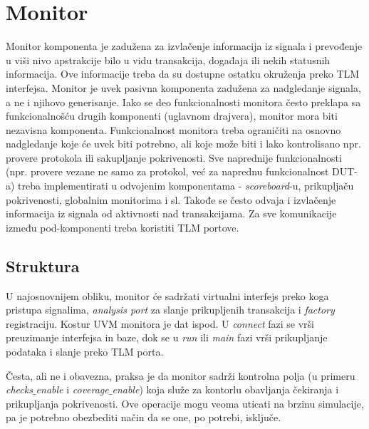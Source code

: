 \section{Monitor}

Monitor komponenta je zadužena za izvlačenje informacija iz signala i
prevođenje u viši nivo apstrakcije bilo u vidu transakcija, događaja ili nekih
statusnih informacija. Ove informacije treba da su dostupne ostatku okruženja
preko TLM interfejsa. Monitor je uvek pasivna komponenta zadužena za nadgledanje
signala, a ne i njihovo generisanje. Iako se deo funkcionalnosti monitora često
preklapa sa funkcionalnošću drugih komponenti (uglavnom drajvera), monitor mora
biti nezavisna komponenta. Funkcionalnost monitora treba ograničiti na osnovno
nadgledanje koje će uvek biti potrebno, ali koje može biti i lako kontrolisano
npr. provere protokola ili sakupljanje pokrivenosti. Sve naprednije
funkcionalnosti (npr. provere vezane ne samo za protokol, već za naprednu
funkcionalnost DUT-a) treba implementirati u odvojenim komponentama -
\emph{scoreboard}-u, prikupljaču pokrivenosti, globalnim monitorima i sl.
Takođe se često odvaja i izvlačenje informacija iz signala od aktivnosti nad
transakcijama. Za sve komunikacije između pod-komponenti treba koristiti TLM
portove.


\subsection{Struktura}

U najosnovnijem obliku, monitor će sadržati virtualni interfejs preko koga
pristupa signalima, \emph{analysis port} za slanje prikupljenih transakcija i
\emph{factory} registraciju. Kostur UVM monitora je dat ispod. U \emph{connect}
fazi se vrši preuzimanje interfejsa in baze, dok se u \emph{run} ili \emph{main}
fazi vrši prikupljanje podataka i slanje preko TLM porta.



Česta, ali ne i obavezna, praksa je da monitor sadrži kontrolna polja (u primeru
\emph{checks\(\_\)enable} i \emph{coverage\(\_\)enable}) koja služe za kontorlu
obavljanja čekiranja i prikupljanja pokrivenosti. Ove operacije mogu veoma
uticati na brzinu simulacije, pa je potrebno obezbediti način da se one, po
potrebi, isključe.

